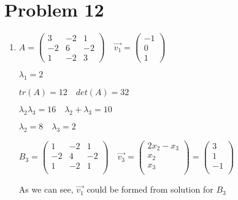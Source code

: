 \documentclass[12pt,letterpaper]{article}
\begin{document}
\section*{Problem 12}
    \begin{enumerate}[label=(\alph*)]
        \item
        $A = \begin{pmatrix}
            3 & -2 & 1 \\
            -2 & 6 & -2 \\
            1 & -2 & 3
        \end{pmatrix}\quad \vec{v_1} = \begin{pmatrix}
            -1 \\
            0 \\
            1
        \end{pmatrix}$
        
        $\lambda_1 = 2$
        
        $tr(A) = 12\quad det(A) = 32$
        
        $\lambda_2\lambda_3 = 16\quad\lambda_2 + \lambda_3 = 10$
        
        $\lambda_2 = 8\quad\lambda_3 = 2$
        
        $B_3 = \begin{pmatrix}
            1 & -2 & 1 \\
            -2 & 4 & -2 \\
            1 & -2 & 1 \\
        \end{pmatrix} \quad \vec{v_3} = \begin{pmatrix}
            2x_2 - x_3 \\
            x_2 \\
            x_3 \\
        \end{pmatrix} = \begin{pmatrix}
            3 \\
            1 \\
            -1 \\
        \end{pmatrix}$
        
        As we can see, $\vec{v_1}$ could be formed from solution for $B_3$
        

\end{enumerate}
\end{document}
